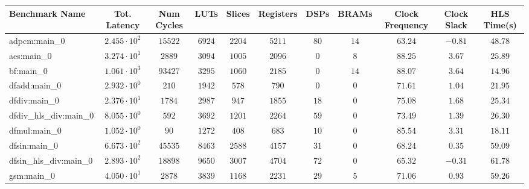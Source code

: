\begin{tabular}{|l|c|c|c|c|c|c|c|c|c|c|}
\hline
Benchmark Name          & Tot. Latency           & Num Cycles & LUTs      & Slices    & Registers & DSPs    & BRAMs   & Clock Frequency & Clock Slack & HLS Time(s) \\
\hline
adpcm:main\_0           & $ 2.455 \cdot 10^{2} $ & $ 15522  $ & $ 6924  $ & $ 2204  $ & $ 5211  $ & $ 80  $ & $ 14  $ & $ 63.24       $ & $ -0.81   $ & $ 48.78   $ \\
aes:main\_0             & $ 3.274 \cdot 10^{1} $ & $ 2889   $ & $ 3094  $ & $ 1005  $ & $ 2096  $ & $ 0   $ & $ 8   $ & $ 88.25       $ & $ 3.67    $ & $ 25.89   $ \\
bf:main\_0              & $ 1.061 \cdot 10^{3} $ & $ 93427  $ & $ 3295  $ & $ 1060  $ & $ 2185  $ & $ 0   $ & $ 14  $ & $ 88.07       $ & $ 3.64    $ & $ 14.96   $ \\
dfadd:main\_0           & $ 2.932 \cdot 10^{0} $ & $ 210    $ & $ 1942  $ & $ 578   $ & $ 790   $ & $ 0   $ & $ 0   $ & $ 71.61       $ & $ 1.04    $ & $ 21.95   $ \\
dfdiv:main\_0           & $ 2.376 \cdot 10^{1} $ & $ 1784   $ & $ 2987  $ & $ 947   $ & $ 1855  $ & $ 18  $ & $ 0   $ & $ 75.08       $ & $ 1.68    $ & $ 25.34   $ \\
dfdiv\_hls\_div:main\_0 & $ 8.055 \cdot 10^{0} $ & $ 592    $ & $ 3692  $ & $ 1201  $ & $ 2264  $ & $ 59  $ & $ 0   $ & $ 73.49       $ & $ 1.39    $ & $ 26.30   $ \\
dfmul:main\_0           & $ 1.052 \cdot 10^{0} $ & $ 90     $ & $ 1272  $ & $ 408   $ & $ 683   $ & $ 10  $ & $ 0   $ & $ 85.54       $ & $ 3.31    $ & $ 18.11   $ \\
dfsin:main\_0           & $ 6.673 \cdot 10^{2} $ & $ 45535  $ & $ 8463  $ & $ 2588  $ & $ 4157  $ & $ 31  $ & $ 0   $ & $ 68.24       $ & $ 0.35    $ & $ 59.09   $ \\
dfsin\_hls\_div:main\_0 & $ 2.893 \cdot 10^{2} $ & $ 18898  $ & $ 9650  $ & $ 3007  $ & $ 4704  $ & $ 72  $ & $ 0   $ & $ 65.32       $ & $ -0.31   $ & $ 61.78   $ \\
gsm:main\_0             & $ 4.050 \cdot 10^{1} $ & $ 2878   $ & $ 3839  $ & $ 1168  $ & $ 2231  $ & $ 29  $ & $ 5   $ & $ 71.06       $ & $ 0.93    $ & $ 59.26   $ \\

\end{tabular}
